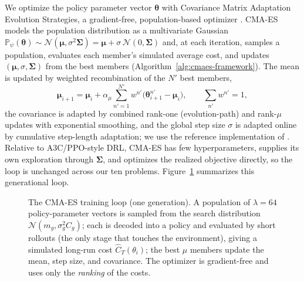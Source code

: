 \documentclass[11pt]{article}
\newcommand{\btheta}{\boldsymbol{\theta}}
\newcommand{\bmu}{\boldsymbol{\mu}}
\newcommand{\bSigma}{\boldsymbol{\Sigma}}
\begin{document}
We optimize the policy parameter vector $\btheta$ with Covariance Matrix Adaptation Evolution
Strategies, a gradient-free, population-based optimizer
\citep{Hansen2001CompletelyStrategies,Salimans2017EvolutionLearning}. CMA-ES models the population
distribution as a multivariate Gaussian $\mathds{P}_\psi(\btheta)\sim\mathcal{N}(\bmu,\sigma^2\bSigma)
=\bmu+\sigma\,\mathcal{N}(0,\bSigma)$ and, at each iteration, samples a population, evaluates each
member's simulated average cost, and updates $(\bmu,\sigma,\bSigma)$ from the best members
(Algorithm~\ref{alg:cmaes-framework}). The mean is updated by weighted recombination of the
$N'$ best members,
\[
\bmu_{i+1}=\bmu_i+\alpha_\mu\sum_{n'=1}^{N'} w^{n'}\big(\btheta^{n'}_{i+1}-\bmu_i\big),
\qquad \sum_{n'} w^{n'}=1,
\]
the covariance is adapted by combined rank-one (evolution-path) and rank-$\mu$ updates with
exponential smoothing, and the global step size $\sigma$ is adapted online by cumulative step-length
adaptation; we use the reference implementation of \citet{Hansen2019pycma}. Relative to A3C/PPO-style
DRL, CMA-ES has few hyperparameters, supplies its own exploration through $\bSigma$, and optimizes
the realized objective directly, so the loop is unchanged across our ten problems.
Figure~\ref{fig:cmaes-loop} summarizes this generational loop.

\begin{figure}[t]
  \centering
  \caption{The CMA-ES training loop (one generation). A population of $\lambda=64$ policy-parameter
  vectors is sampled from the search distribution $\mathcal{N}(m_g,\sigma_g^2 C_g)$; each is decoded
  into a policy and evaluated by short rollouts (the only stage that touches the environment), giving a
  simulated long-run cost $\hat C_T(\theta_i)$; the best $\mu$ members update the mean, step size, and
  covariance. The optimizer is gradient-free and uses only the \emph{ranking} of the costs.}
  \label{fig:cmaes-loop}
\end{figure}
\end{document}
